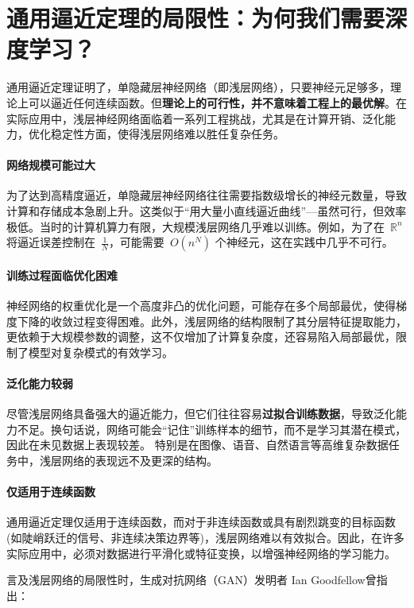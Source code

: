 \section{通用逼近定理的局限性：为何我们需要深度学习？}

通用逼近定理证明了，单隐藏层神经网络（即浅层网络），只要神经元足够多，理论上可以逼近任何连续函数。但{\bf 理论上的可行性，并不意味着工程上的最优解}。在实际应用中，浅层神经网络面临着一系列工程挑战，尤其是在计算开销、泛化能力，优化稳定性方面，使得浅层网络难以胜任复杂任务。

\paragraph*{ 网络规模可能过大}
为了达到高精度逼近，单隐藏层神经网络往往需要指数级增长的神经元数量，导致计算和存储成本急剧上升。这类似于“用大量小直线逼近曲线”---虽然可行，但效率极低。当时的计算机算力有限，大规模浅层网络几乎难以训练。例如，为了在~$\mathbb{R}^n$ 将逼近误差控制在~$\frac{1}{N}$，可能需要~$ O(n^N)$ 个神经元，这在实践中几乎不可行。

\paragraph*{ 训练过程面临优化困难}
神经网络的权重优化是一个高度非凸的优化问题，可能存在多个局部最优，使得梯度下降的收敛过程变得困难。此外，浅层网络的结构限制了其分层特征提取能力，更依赖于大规模参数的调整，这不仅增加了计算复杂度，还容易陷入局部最优，限制了模型对复杂模式的有效学习。

\paragraph*{泛化能力较弱}
尽管浅层网络具备强大的逼近能力，但它们往往容易{\bf 过拟合训练数据}，导致泛化能力不足。换句话说，网络可能会“记住”训练样本的细节，而不是学习其潜在模式，因此在未见数据上表现较差。 特别是在图像、语音、自然语言等高维复杂数据任务中，浅层网络的表现远不及更深的结构。

\paragraph*{ 仅适用于连续函数}
通用逼近定理仅适用于连续函数，而对于非连续函数或具有剧烈跳变的目标函数(如陡峭跃迁的信号、非连续决策边界等)，浅层网络难以有效拟合。因此，在许多实际应用中，必须对数据进行平滑化或特征变换，以增强神经网络的学习能力。

言及浅层网络的局限性时，生成对抗网络（GAN）发明者 Ian Goodfellow曾指出：

